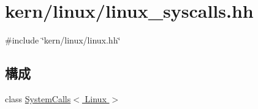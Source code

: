 \hypertarget{linux__syscalls_8hh}{
\section{kern/linux/linux\_\-syscalls.hh}
\label{linux__syscalls_8hh}
}
{\ttfamily \#include \char`\"{}kern/linux/linux.hh\char`\"{}}\par
\subsection*{構成}
\begin{DoxyCompactItemize}
\item 
class \hyperlink{classSystemCalls_3_01Linux_01_4}{SystemCalls$<$ Linux $>$}
\end{DoxyCompactItemize}
